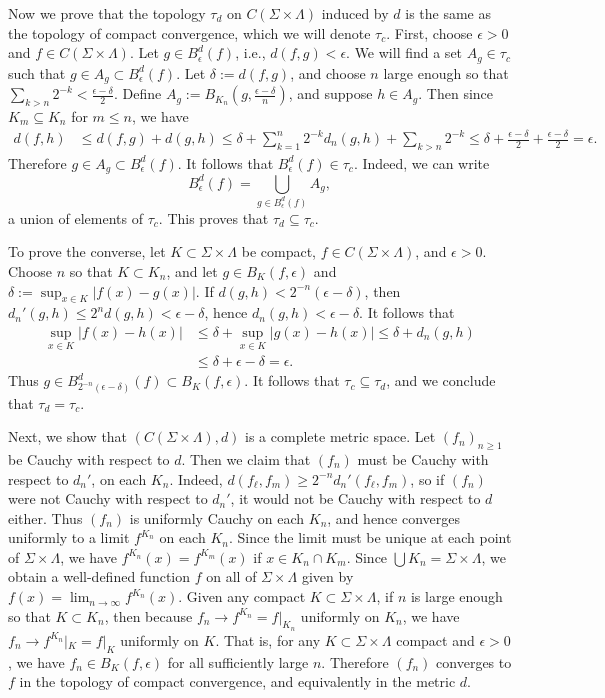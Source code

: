Now we prove that the topology $\tau_d$ on $C(\Sigma\times\Lambda)$ induced by $d$ is the same as the topology of compact convergence, which we will denote $\tau_c$. First, choose $\epsilon>0$ and $f\in C(\Sigma\times\Lambda)$. Let $g\in B^d_\epsilon(f)$, i.e., $d(f,g)<\epsilon$. We will find a set $A_g\in\tau_c$ such that $g\in A_g\subset B^d_\epsilon(f)$. Let $\delta := d(f,g)$, and choose $n$ large enough so that $\sum_{k>n} 2^{-k} < \frac{\epsilon-\delta}{2}$. Define $A_g := B_{K_n}(g,\frac{\epsilon-\delta}{n})$, and suppose $h\in A_g$. Then since $K_m\subseteq K_n$ for $m\leq n$, we have
\begin{align*}
d(f,h) &\leq d(f,g) + d(g,h) \leq \delta + \sum_{k=1}^n 2^{-k}d_n(g,h) + \sum_{k>n} 2^{-k} \leq \delta + \frac{\epsilon-\delta}{2} + \frac{\epsilon-\delta}{2} = \epsilon.
\end{align*}
Therefore $g\in A_g\subset B^d_\epsilon(f)$. It follows that $B^d_\epsilon(f)\in \tau_c$. Indeed, we can write
\[
B^d_\epsilon(f) = \bigcup_{g\in B^d_\epsilon(f)} A_g,
\]
a union of elements of $\tau_c$. This proves that $\tau_d\subseteq\tau_c$.

To prove the converse, let $K\subset\Sigma\times\Lambda$ be compact, $f\in C(\Sigma\times\Lambda)$, and $\epsilon>0$. Choose $n$ so that $K\subset K_n$, and let $g\in B_K(f,\epsilon)$ and $\delta:= \sup_{x\in K} |f(x)-g(x)|$. If $d(g,h) < 2^{-n}(\epsilon-\delta)$, then $d_n'(g,h) \leq 2^n d(g,h) < \epsilon-\delta$, hence $d_n(g,h) < \epsilon-\delta$. It follows that
\begin{align*}
\sup_{x\in K} |f(x)-h(x)| &\leq \delta + \sup_{x\in K} |g(x)-h(x)| \leq \delta + d_n(g,h)\\
&\leq \delta + \epsilon-\delta = \epsilon.
\end{align*}
Thus $g\in B^d_{2^{-n}(\epsilon-\delta)}(f) \subset B_K(f,\epsilon)$. It follows that $\tau_c\subseteq \tau_d$, and we conclude that $\tau_d = \tau_c$.

Next, we show that $(C(\Sigma\times\Lambda), d)$ is a complete metric space. Let $(f_n)_{n\geq 1}$ be Cauchy with respect to $d$. Then we claim that $(f_n)$ must be Cauchy with respect to $d_n'$, on each $K_n$. Indeed, $d(f_\ell, f_m) \geq 2^{-n}d_n'(f_\ell, f_m)$, so if $(f_n)$ were not Cauchy with respect to $d_n'$, it would not be Cauchy with respect to $d$ either. Thus $(f_n)$ is uniformly Cauchy on each $K_n$, and hence converges uniformly to a limit $f^{K_n}$ on each $K_n$. Since the limit must be unique at each point of $\Sigma\times\Lambda$, we have $f^{K_n}(x) = f^{K_m}(x)$ if $x\in K_n\cap K_m$. Since $\bigcup K_n = \Sigma\times\Lambda$, we obtain a well-defined function $f$ on all of $\Sigma\times\Lambda$ given by $f(x)=\lim_{n\to\infty} f^{K_n}(x)$. Given any compact $K\subset \Sigma\times\Lambda$, if $n$ is large enough so that $K\subset K_n$, then because $f_n \to f^{K_n} = f|_{K_n}$ uniformly on $K_n$, we have $f_n \to f^{K_n}|_K = f|_K$ uniformly on $K$. That is, for any $K\subset\Sigma\times\Lambda$ compact and $\epsilon>0$, we have $f_n \in B_K(f,\epsilon)$ for all sufficiently large $n$. Therefore $(f_n)$ converges to $f$ in the topology of compact convergence, and equivalently in the metric $d$.


